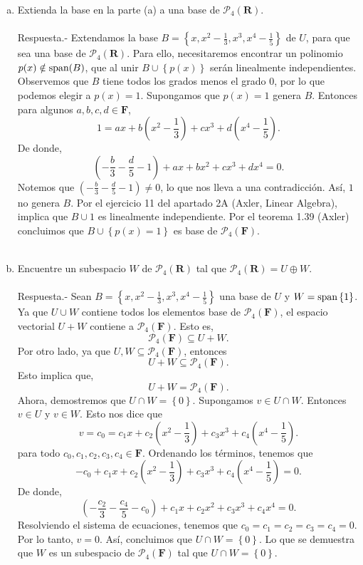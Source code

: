 \begin{enumerate}[\bfseries 1.]
\begin{enumerate}[(a)]
	    \item Extienda la base en la parte (a) a una base de $\mathcal{P}_4(\textbf{R})$.\\\\
		Respuesta.-\; Extendamos la base $B=\left\{x,x^2-\frac{1}{3},x^3,x^4-\frac{1}{5}\right\}$ de $U$, para que sea una base de $\mathcal{P}_4(\textbf{R})$. Para ello, necesitaremos encontrar un polinomio $p(x)\notin \mathop{\mbox{\normalfont span}}\nolimits(B)$, que al unir $B\cup \left\{p(x)\right\}$ serán linealmente independientes. \\
		Observemos que $B$ tiene todos los grados menos el grado $0$, por lo que podemos elegir a $p(x)=1$. Supongamos que  $p(x)=1$ genera $B$. Entonces para algunos $a,b,c,d\in \textbf{F}$,
		$$1=ax+b\left(x^2-\dfrac{1}{3}\right)+cx^3+d\left(x^4-\dfrac{1}{5}\right).$$
		De donde,
		$$\left(-\dfrac{b}{3}-\dfrac{d}{5}-1\right)+ax+bx^2+cx^3+dx^4=0.$$
		Notemos que $\left(-\frac{b}{3}-\frac{d}{5}-1\right)\neq 0$, lo que nos lleva a una contradicción. Así, $1$ no genera $B$. Por el ejercicio 11 del apartado 2A (Axler, Linear Algebra), implica que $B\cup 1$ es linealmente independiente. Por el teorema 1.39 (Axler) concluimos que $B\cup \left\{p(x)=1\right\}$ es base de $\mathcal{P}_4(\textbf{F})$.\\\\

	    \item Encuentre un subespacio $W$ de $\mathcal{P}_4(\textbf{R})$ tal que $\mathcal{P}_4(\textbf{R})=U\oplus W$.\\\\
		Respuesta.-\; Sean $B=\left\{x,x^2-\frac{1}{3},x^3,x^4-\frac{1}{5}\right\}$ una base de $U$ y $W=\mathop{\mbox{\normalfont span}}\nolimits\left\{1\right\}$. Ya que $U\cup W$ contiene todos los elementos base de $\mathcal{P}_4(\textbf{F})$, el espacio vectorial $U+W$ contiene a $\mathcal{P}_4(\textbf{F})$. Esto es,
		$$\mathcal{P}_4(\textbf{F})\subseteq U+W.$$
		Por otro lado, ya que $U,W\subseteq \mathcal{P}_4(\textbf{F})$, entonces
		$$U+W\subseteq \mathcal{P}_4(\textbf{F}).$$
		Esto implica que,
		$$U+W=\mathcal{P}_4(\textbf{F}).$$
		Ahora, demostremos que $U\cap W=\left\{0\right\}$. Supongamos $v\in U\cap W$. Entonces $v\in U$ y $v\in W$. Esto nos dice que
		$$v=c_0=c_1x+c_2\left(x^2-\dfrac{1}{3}\right)+c_3x^3+c_4\left(x^4-\dfrac{1}{5}\right).$$
		para todo $c_0,c_1,c_2,c_3,c_4\in \textbf{F}$. Ordenando los términos, tenemos que
		$$-c_0+c_1x+c_2\left(x^2-\dfrac{1}{3}\right)+c_3x^3+c_4\left(x^4-\dfrac{1}{5}\right)=0.$$
		De donde,
		$$\left(-\dfrac{c_2}{3}-\dfrac{c_4}{5}-c_0\right)+c_1x+c_2x^2+c_3x^3+c_4x^4=0.$$
		Resolviendo el sistema de ecuaciones, tenemos que $c_0=c_1=c_2=c_3=c_4=0$. Por lo tanto, $v=0$. Así, concluimos que $U\cap W=\left\{0\right\}$. Lo que se demuestra que $W$ es un subespacio de $\mathcal{P}_4(\textbf{F})$ tal que $U\cap W=\left\{0\right\}.$\\\\


\end{enumerate}
\end{enumerate}
